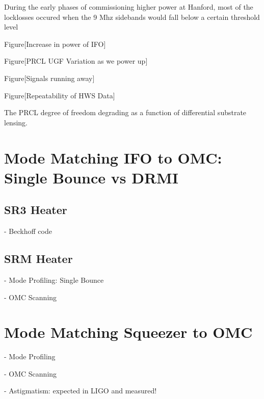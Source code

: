 	During the early phases of commissioning higher power at Hanford, most of the locklosses occured when the 9 Mhz sidebands would fall below a certain threshold level 


		Figure[Increase in power of IFO]
		
		Figure[PRCL UGF Variation as we power up]
		
		Figure[Signals running away]
		
		Figure[Repeatability of HWS Data]
		
		The PRCL degree of freedom degrading as a function of differential substrate lensing.
	

\section{Mode Matching IFO to OMC: Single Bounce vs DRMI}
	\subsection{SR3 Heater}
	- Beckhoff code


	\subsection{SRM Heater}
	- Mode Profiling: Single Bounce
	
	- OMC Scanning

\section{Mode Matching Squeezer to OMC}
	- Mode Profiling
	
	- OMC Scanning
	
	- Astigmatism: expected in LIGO and measured!